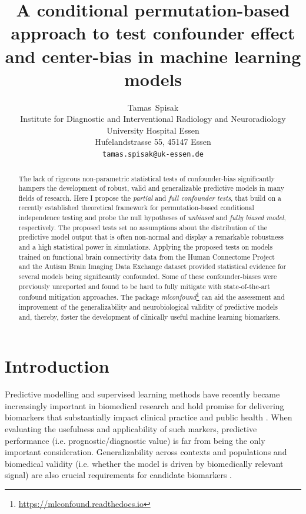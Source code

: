 \documentclass{article}
\title{A conditional permutation-based approach to test confounder effect and center-bias in machine learning models}
\author{
  Tamas~Spisak \\
  Institute for Diagnostic and Interventional Radiology and Neuroradiology \\
  University Hospital Essen\\
  Hufelandstrasse 55, 45147 Essen \\
  \texttt{tamas.spisak@uk-essen.de} \\
}
\begin{document}
\maketitle

\begin{abstract} %
The lack of rigorous non-parametric statistical tests of confounder-bias significantly hampers the development of robust, valid and generalizable predictive models in many fields of research.
Here I propose the \emph{partial} and \emph{full confounder tests}, that build on a recently established theoretical framework for permutation-based conditional independence testing and probe the null hypotheses of \emph{unbiased} and \emph{fully biased model}, respectively.
The proposed tests set no assumptions about the distribution of the predictive model output that is often non-normal and display a remarkable robustness and a high statistical power in simulations.
Applying the proposed tests on models trained on functional brain connectivity data from the Human Connectome Project and the Autism Brain Imaging Data Exchange dataset provided statistical evidence for several models being significantly confounded. Some of these confounder-biases were previously unreported and found to be hard to fully mitigate with state-of-the-art confound mitigation approaches.
The package \emph{mlconfound}\footnote{\href{https://mlconfound.readthedocs.io}{https://mlconfound.readthedocs.io}} can aid the assessment and improvement of the generalizability and neurobiological validity of predictive models and, thereby, foster the development of clinically useful machine learning biomarkers.
\end{abstract}



\section{Introduction}

Predictive modelling and supervised learning methods have recently became increasingly important in biomedical research and hold promise for delivering biomarkers that substantially impact clinical practice and public health \citep{kent2018personalized}. When evaluating the usefulness and applicability of such markers, predictive performance (i.e. prognostic/diagnostic value) is far from being the only important consideration. Generalizability across contexts and populations and biomedical validity (i.e. whether the model is driven by biomedically relevant signal) are also crucial requirements for candidate biomarkers \citep{woo2017building}.
\end{document}
